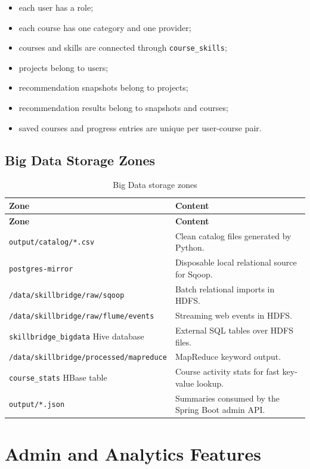 \documentclass[12pt,a4paper]{report}
\begin{document}
\begin{itemize}[leftmargin=*]
    \item each user has a role;
    \item each course has one category and one provider;
    \item courses and skills are connected through \texttt{course\_skills};
    \item projects belong to users;
    \item recommendation snapshots belong to projects;
    \item recommendation results belong to snapshots and courses;
    \item saved courses and progress entries are unique per user-course pair.
\end{itemize}

\section{Big Data Storage Zones}
\begin{longtable}{p{}p{}}
\caption{Big Data storage zones}\\
\toprule
\textbf{Zone} & \textbf{Content}\\
\midrule
\endfirsthead
\toprule
\textbf{Zone} & \textbf{Content}\\
\midrule
\endhead
\texttt{output/catalog/*.csv} & Clean catalog files generated by Python.\\
\texttt{postgres-mirror} & Disposable local relational source for Sqoop.\\
\texttt{/data/skillbridge/raw/sqoop} & Batch relational imports in HDFS.\\
\texttt{/data/skillbridge/raw/flume/events} & Streaming web events in HDFS.\\
\texttt{skillbridge\_bigdata} Hive database & External SQL tables over HDFS files.\\
\texttt{/data/skillbridge/processed/mapreduce} & MapReduce keyword output.\\
\texttt{course\_stats} HBase table & Course activity stats for fast key-value lookup.\\
\texttt{output/*.json} & Summaries consumed by the Spring Boot admin API.\\
\bottomrule
\end{longtable}

\chapter{Admin and Analytics Features}
\end{document}
